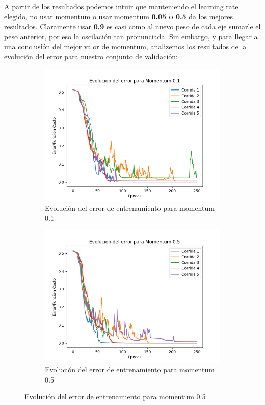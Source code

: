 A partir de los resultados podemos intuir que manteniendo el learning rate elegido, no usar momentum o usar momentum \textbf{0.05 o 0.5} da los mejores resultados. Claramente
usar \textbf{0.9} es casi como al nuevo peso de cada eje sumarle el peso anterior, por eso la oscilación tan pronunciada. Sin embargo, y para llegar a una conclusión del mejor 
valor de momentum, analizemos los resultados de la evolución del error para nuestro conjunto de validación:

\begin{figure}[!htbp]
\centering
\begin{subfigure}{.5\textwidth}
  \centering
  \includegraphics[width=1\linewidth]{graficos/momentum_0_1.png}
  \caption{Evolución del error de entrenamiento para momentum 0.1}
  \label{fig:sub1}
\end{subfigure}%
\begin{subfigure}{.5\textwidth}
  \centering
  \includegraphics[width=1\linewidth]{graficos/momentum_0_5.png}
  \caption{Evolución del error de entrenamiento para momentum 0.5}
  \label{fig:sub2}
\end{subfigure}
\end{figure}


